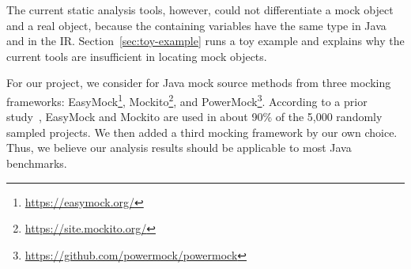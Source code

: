 The current static analysis tools, however, could not differentiate a mock object and a real object, because the containing variables have the same type in Java and in the IR. Section~\ref{sec:toy-example} runs a toy example and explains why the current tools are insufficient in locating mock objects.

For our project, we consider for Java mock source methods from three mocking frameworks: EasyMock\footnote{\url{https://easymock.org/}}, Mockito\footnote{\url{https://site.mockito.org/}}, and PowerMock\footnote{\url{https://github.com/powermock/powermock}}. According to a prior study~\cite{mostafa14:_empirical_study_mock_frameworks}, EasyMock and Mockito are used in about 90\% of the 5,000 randomly sampled projects. We then added a third mocking framework by our own choice. Thus, we believe our analysis results should be applicable to most Java benchmarks. 